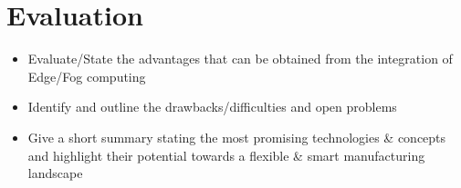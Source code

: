 \section{Evaluation}\label{sec:evaluation} 

\begin{itemize}
\item Evaluate/State the advantages that can be obtained from the integration of Edge/Fog computing 
\item Identify and outline the drawbacks/difficulties and open problems
\item Give a short summary stating the most promising technologies \& concepts and highlight their potential towards a flexible \& smart manufacturing landscape
\end{itemize}